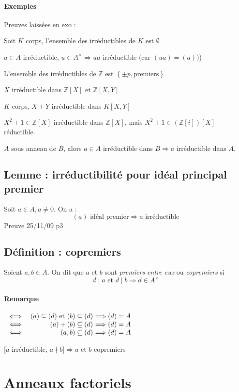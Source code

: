 \documentclass[reqno,a4paper,10pt]{report}
\makeatletter
\newcommand{\set}[1]{\left\lbrace #1 \right\rbrace} %
\newcommand{\IZ}{\ensuremath{\mathbb{Z}}\xspace} %
\newcommand{\so}{\Rightarrow}
\newcommand{\soo}{\Longrightarrow}
\let\olditemize=\itemize%
\renewenvironment{itemize}{%
    \olditemize%
  }{%
    \@noparlisttrue%
    \endlist%
  }%
\makeatother
\begin{document}
\paragraph{Exemples} Preuves laissées en exo :
\begin{itemize}
  \item Soit $K$ corps, l'ensemble des irréductibles de $K$ est $\emptyset$
  \item $a\in A$ irréductible, $u\in A^\times \so ua$ irréductible (car
    $(ua)=(a))$)
  \item L'ensemble des irréductibles de $\IZ$ est $\set{\pm p, \text{
  premiers}}$
  \item $X$ irréductible dans $\IZ[X]$ et $\IZ[X,Y]$
  \item $K$ corps, $X+Y$ irréductible dans $K[X,Y]$
  \item $X^2+1\in \IZ[X]$ irréductible dans $\IZ[X]$, mais $X^2+1 \in
    (\IZ[i])[X]$ réductible.
  \item $A$ sous anneau de $B$, alors $a\in A$ irréductible dans $B\so a $
    irréductible dans $A$.
\end{itemize}

\subsection{Lemme : irréductibilité pour idéal principal premier}
Soit $a\in A, a\neq 0$. On a :
\[(a) \text{ idéal premier} \so a \text{ irréductible}\]
  Preuve 25/11/09 p3

\subsection{Définition : copremiers}
Soient $a,b \in A$. On dit que $a$ et $b$ sont \emph{premiers entre eux} ou
\emph{copremiers} si
\[d \mid a \text{ et } d \mid b \soo d\in A^\times\]
\paragraph{Remarque}
$\begin{array}[t]{rr@{\ }l}
  \iff& (a) \subseteq (d) \text{ et } (b)\subseteq (d) &\soo (d) = A\\
  \iff& (a)+(b)\subseteq (d) &\soo (d)=A\\
  \iff& (a,b)\subseteq (d) &\soo (d)=A
\end{array}$

$[a$ irréductible, $a \nmid b] \so a$ et $b$ copremiers

\section{Anneaux factoriels}
\end{document}
